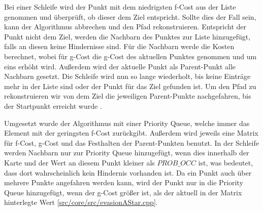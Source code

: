 Bei einer Schleife wird der Punkt mit dem niedrigsten f-Cost aus der Liste genommen und überprüft, ob dieser dem Ziel entspricht. 
Sollte dies der Fall sein, kann der Algorithmus abbrechen und den Pfad rekonstruieren. 
Entspricht der Punkt nicht dem Ziel, werden die Nachbarn des Punktes zur Liste hinzugefügt, falls an diesen keine Hindernisse sind. 
Für die Nachbarn werde die Kosten berechnet, wobei für g-Cost die g-Cost des aktuellen Punktes genommen und um eins erhöht wird. 
Außerdem wird der aktuelle Punkt als Parent-Punkt alle Nachbarn gesetzt. 
Die Schleife wird nun so lange wiederholt, bis keine Einträge mehr in der Liste sind oder der Punkt für das Ziel gefunden ist. 
Um den Pfad zu rekonstruieren wir von dem Ziel die jeweiligen Parent-Punkte nachgefahren, bis der Startpunkt erreicht wurde \cite{hartFormalBasisHeuristic1968}. 

Umgesetzt wurde der Algorithmus mit einer Priority Queue, welche immer das Element mit der geringsten f-Cost zurückgibt.
Außerdem wird jeweils eine Matrix für f-Cost, g-Cost und das Festhalten der Parent-Punkten benutzt. 
In der Schleife werden Nachbarn nur zur Priority Queue hinzugefügt, wenn dies innerhalb der Karte und der Wert an diesem Punkt kleiner als \(PROB\_OCC\) ist, 
was bedeutet, dass dort wahrscheinlich kein Hindernis vorhanden ist. 
Da ein Punkt auch über mehrere Punkte angefahren werden kann, wird der Punkt nur in die Priority Queue hinzugefügt, 
wenn der g-Cost größer ist, als der aktuell in der Matrix hinterlegte Wert 
[\href{https://github.com/Jundy0/Studienarbeit/blob/main/src/core/src/evasionAStar.cpp}{src/core/src/evasionAStar.cpp}]. 

